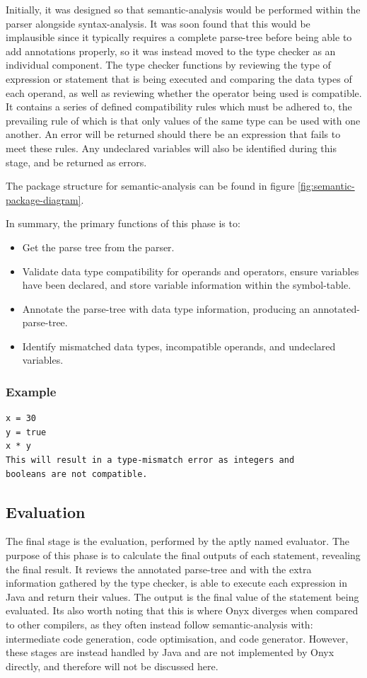 \documentclass[
]{report}
\begin{document}
Initially, it was designed so that \gls{semantic-analysis} would be performed
within the parser alongside \gls{syntax-analysis}. It was soon found that this
would be implausible since it typically requires a complete \gls{parse-tree}
before being able to add annotations properly, so it was instead moved
to the type checker as an individual component. The type checker
functions by reviewing the type of \gls{expression} or \gls{statement} that is being
executed and comparing the data types of each operand, as well as
reviewing whether the operator being used is compatible. It contains a
series of defined compatibility rules which must be adhered to, the
prevailing rule of which is that only values of the same type can be
used with one another. An error will be returned should there be an
\gls{expression} that fails to meet these rules. Any undeclared variables will
also be identified during this stage, and be returned as errors.

The package structure for \gls{semantic-analysis} can be found in figure \ref{fig:semantic-package-diagram}.

In summary, the primary functions of this phase is to: 
\begin{itemize}
	\item Get the parse tree from the parser.
	\item Validate data type compatibility for operands and operators, ensure variables have been declared, and store variable information within the \gls{symbol-table}. 
	\item Annotate the \gls{parse-tree} with data type information, producing an \gls{annotated-parse-tree}.
	\item Identify mismatched data types, incompatible operands, and undeclared variables.
\end{itemize}

\subsubsection{Example}
\begin{verbatim}
x = 30
y = true
x * y
This will result in a type-mismatch error as integers and 
booleans are not compatible.
\end{verbatim}

\subsection{Evaluation}
The final stage is the evaluation, performed by the aptly named
evaluator. The purpose of this phase is to calculate the final outputs
of each \gls{statement}, revealing the final result. It reviews the annotated
\gls{parse-tree} and with the extra information gathered by the type checker,
is able to execute each \gls{expression} in Java and return their values. The
output is the final value of the \gls{statement} being evaluated. Its also
worth noting that this is where Onyx diverges when compared to other
compilers, as they often instead follow \gls{semantic-analysis} with:
intermediate code generation, code optimisation, and code generator.
However, these stages are instead handled by Java and are not
implemented by Onyx directly, and therefore will not be discussed here.
\end{document}
